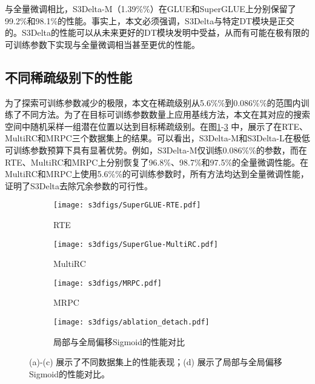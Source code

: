 与全量微调相比，S3Delta-M（1.39\%\%）在GLUE和SuperGLUE上分别保留了99.2\%和98.1\%的性能。事实上，本文必须强调，S3Delta与特定DT模块是正交的。S3Delta的性能可以从未来更好的DT模块发明中受益，从而有可能在极有限的可训练参数下实现与全量微调相当甚至更优的性能。

\subsection{不同稀疏级别下的性能}
\label{sec:exp:sparsitylevel}
为了探索可训练参数减少的极限，本文在稀疏级别从5.6\%\%到0.086\%\%的范围内训练了不同方法。为了在目标可训练参数数量上应用基线方法，本文在其对应的搜索空间中随机采样一组潜在位置以达到目标稀疏级别。在图\ref{fig:case3}-\ref{fig:case5} 中，展示了在RTE、MultiRC和MRPC三个数据集上的结果。可以看出，S3Delta-M和S3Delta-L在极低可训练参数预算下具有显著优势。例如，S3Delta-M仅训练0.086\%\%的参数，而在RTE、MultiRC和MRPC上分别恢复了96.8\%、98.7\%和97.5\%的全量微调性能。在MultiRC和MRPC上使用5.6\%\%的可训练参数时，所有方法均达到全量微调性能，证明了S3Delta去除冗余参数的可行性。

\begin{figure}[htbp]
    \centering
    \begin{subfigure}[t]{0.48\textwidth}
      \centering
      \texttt{[image: s3dfigs/SuperGLUE-RTE.pdf]}
      \caption{RTE}
      \label{fig:case3}
    \end{subfigure}%
    \hfill
    \begin{subfigure}[t]{0.48\textwidth}
      \centering
      \texttt{[image: s3dfigs/SuperGlue-MultiRC.pdf]}
      \caption{MultiRC}
      \label{fig:case4}
    \end{subfigure}
    
    \vspace{0.5em} %
    
    \begin{subfigure}[t]{0.48\textwidth}
      \centering
      \texttt{[image: s3dfigs/MRPC.pdf]}
      \caption{MRPC}
      \label{fig:case5}
    \end{subfigure}%
    \hfill
    \begin{subfigure}[t]{0.48\textwidth}
      \centering
      \texttt{[image: s3dfigs/ablation\_detach.pdf]}
      \caption{局部与全局偏移Sigmoid的性能对比}
      \label{app:fig:detach}
    \end{subfigure}
    
    \caption{(a)-(c) 展示了不同数据集上的性能表现；(d) 展示了局部与全局偏移Sigmoid的性能对比。}
    \label{fig:combined}
  \end{figure}
  

